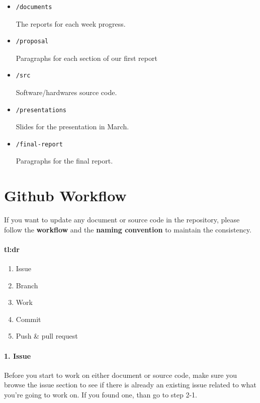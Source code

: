 \documentclass[12pt,a4paper]{article}
\begin{document}
\begin{appendices}
      \begin{itemize}
      \item \begin{verbatim}/documents\end{verbatim}
        The reports for each week progress.
      \item \begin{verbatim}/proposal\end{verbatim}
        Paragraphs for each section of our first report
      \item \begin{verbatim}/src\end{verbatim}
        Software/hardwares source code.
      \item \begin{verbatim}/presentations\end{verbatim}
        Slides for the presentation in March.
      \item \begin{verbatim}/final-report\end{verbatim}
        Paragraphs for the final report.
      \end{itemize}


    \section{Github Workflow}
      \label{appendix: github-workflow}
      If you want to update any document or source code in the repository, please follow the {\bf workflow} and the {\bf naming convention} to maintain the consistency.
      
    \paragraph{tl:dr}
      \begin{enumerate}
        \item Issue
        \item Branch
        \item Work
        \item Commit
        \item Push \& pull request
      \end{enumerate}
      
      \paragraph{1. Issue}
      Before you start to work on either document or source code, make sure you browse the issue section to see if there is already an existing issue related to what you're going to work on. If you found one, than go to step 2-1.

\end{appendices}
\end{document}
